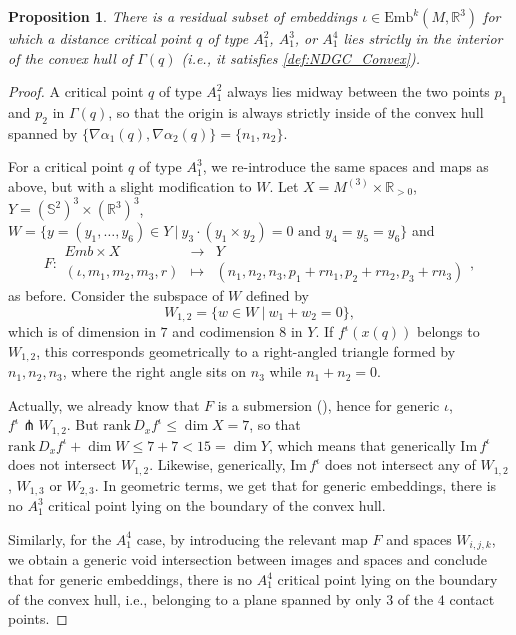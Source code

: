 \documentclass[11pt]{article}
\newcommand{\R}{\mathbb{R}}
\newcommand{\io}{\iota}
\newcommand{\Emb}{\mathrm{Emb}^k(M,\R^3)}
\newcommand{\grad}{\nabla}
\renewcommand{\Im}{\mathrm{Im} \,}
\newcommand{\rank}{\mathrm{rank} \,}
\theoremstyle{plain}
\newtheorem{prop}{Proposition}
\theoremstyle{definition}
\theoremstyle{remark}
\begin{document}
	\begin{prop}	\label{prop:A1_convex hull}
		There is a residual subset of embeddings $\iota \in \Emb$ for which a distance critical point $q$ of type $A_1^2$, $A_1^3$, or $A_1^4$ lies strictly in the interior of the convex hull of $\Gamma(q)$ (i.e., it satisfies \ref{def:NDGC_Convex}).
	\end{prop}
	
	\begin{proof}
		A critical point $q$ of type $A_1^2$ always lies midway between the two points $p_1$ and $p_2$ in $\Gamma(q)$, so that the origin is always strictly inside of the convex hull spanned by $\{\grad \alpha_1(q), \grad \alpha_2(q)\} = \{n_1, n_2\}$.
		
		For a critical point $q$ of type $A_1^3$, we re-introduce the same spaces and maps as above, but with a slight modification to $W$.
		Let $X = M^{(3)} \times \R_{>0}$, $Y = (\mathbb{S}^2)^3 \times (\R^3)^3$, $W = \{y = (y_1,\ldots, y_6)\in Y ~|~ y_3 \cdot (y_1 \times y_2) = 0 \text{ and } y_4 = y_5 = y_6 \}$ and
		\begin{equation*}
			F:
			\begin{array}{ccc}
				Emb \times X & \to & Y \\
				(\io, m_1,m_2,m_3,r) & \mapsto & (n_1, n_2, n_3, p_1 + r n_1, p_2 + r n_2 , p_3 + r n_3)
			\end{array},
		\end{equation*} 
		as before. Consider the subspace of $W$ defined by
		\[W_{1,2} = \{ w \in W ~|~ w_1 + w_2 = 0 \},\]
		which is of dimension in $7$ and codimension $8$ in $Y$. If $f^\io(x(q))$ belongs to $W_{1,2}$, this corresponds geometrically to a right-angled triangle formed by $n_1,n_2,n_3$, where the right angle sits on $n_3$ while $n_1 + n_2 = 0$. 
		
		Actually, we already know that $F$ is a submersion (), hence for generic $\io$, $f^\io \pitchfork W_{1,2}$. But $\rank D_x f^\io \leq \dim X = 7$, so that $\rank D_x f^\io + \dim W \leq 7 + 7 < 15 = \dim Y$,
		which means that generically $\Im f^\io$ does not intersect $W_{1,2}$. Likewise, generically, $\Im f^\io$ does not intersect any of $W_{1,2}$, $W_{1,3}$ or $W_{2,3}$. In geometric terms, we get that for generic embeddings, there is no $A_1^3$ critical point lying on the boundary of the convex hull.
		
		Similarly, for the $A_1^4$ case, by introducing the relevant map $F$ and spaces $W_{i,j,k}$, we obtain a generic void intersection between images and spaces and conclude that for generic embeddings, there is no $A_1^4$ critical point lying on the boundary of the convex hull, i.e., belonging to a plane spanned by only $3$ of the $4$ contact points.
	\end{proof}
	
\end{document}
